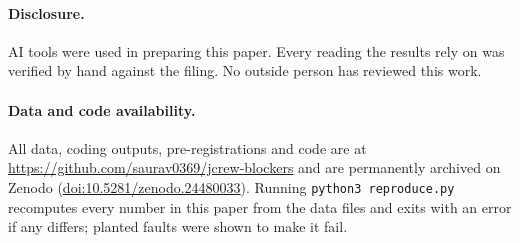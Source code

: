 \documentclass[12pt]{article}
\begin{document}
\paragraph{Disclosure.} AI tools were used in preparing this paper. Every reading the results rely on was verified by hand against the filing. No outside person has reviewed this work.

\paragraph{Data and code availability.} All data, coding outputs, pre-registrations and code are at \url{https://github.com/saurav0369/jcrew-blockers} and are permanently archived on Zenodo (\href{https://doi.org/10.5281/zenodo.24480033}{doi:10.5281/zenodo.24480033}). Running \texttt{python3 reproduce.py} recomputes every number in this paper from the data files and exits with an error if any differs; planted faults were shown to make it fail.



\nocite{JCrew2017,AMC2024,Bausch2022,Revlon2023,Trinseo2023}

\clearpage
\appendix
\end{document}
